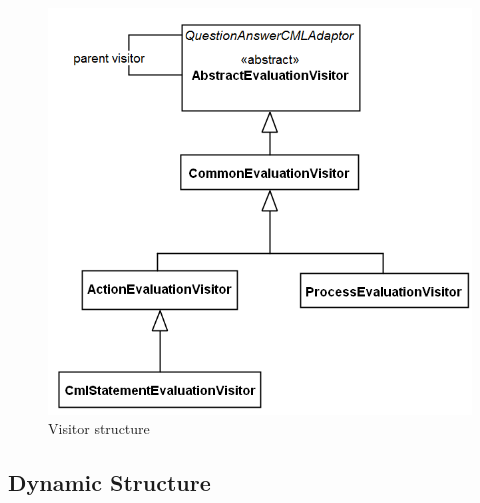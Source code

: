 \documentclass[a4paper, 12pt]{include/compassreport}   %
\begin{document}
\begin{figure}[ht!]
  \begin{center}
    \includegraphics[width=1\textwidth]{figures/Visitors}
    \caption{Visitor structure}
    \label{fig:visitors}
  \end{center}
\end{figure}



\subsection{Dynamic Structure}
\label{sec:dynamic_structure}


\newpage

 
\label{ch:bib} %
\end{document}
